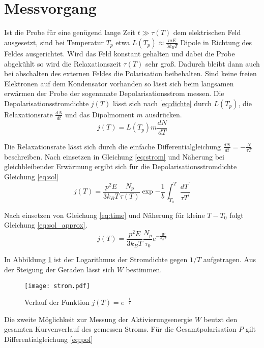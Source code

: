 \section{Messvorgang}
\label{sec:messvorgang}

Ist die Probe für eine genügend lange Zeit $t \gg \tau(T)$ dem elektrischen Feld ausgesetzt,
sind bei Temperatur $T_p$ etwa $L(T_p) \approx \frac{m E}{3 k_B T}$ Dipole in Richtung des Feldes ausgerichtet.
Wird das Feld konstant gehalten und dabei die Probe abgekühlt so wird die Relaxationszeit $\tau(T)$ sehr groß.
Dadurch bleibt dann auch bei abschalten des externen Feldes die Polarisation beibehalten.
Sind keine freien Elektronen auf dem Kondensator vorhanden so lässt sich beim langsamen erwärmen der Probe der sogennnate Depolarisationsstrom messen.
Die Depolarisationsstromdichte $j(T)$ lässt sich nach \eqref{eq:dichte} durch $L(T_p)$, die Relaxationsrate
$\frac{dN}{dt}$ und das Dipolmoment $m$ ausdrücken.
\begin{equation}
  \label{eq:strom}
  j(T) = L(T_p) m \frac{dN}{dT}
\end{equation}


Die Relaxationsrate lässt sich durch die einfache Differentialgleichung $\frac{dN}{dt} = - \frac{N}{\tau{T}}$ beschreiben.
Nach einsetzen in Gleichung \ref{eq:strom} und Näherung bei gleichbleibender Erwärmung ergibt sich für die Depolarisationsstromdichte
Gleichung \eqref{eq:sol}
\begin{equation}
  \label{eq:sol}
  j(T) = \frac{p^2 E}{3 k_B T} \frac{N_p}{\tau(T)} \exp{-\frac{1}{b} \int_{T_0}^{T} \frac{dT^{\prime}}{\tau{T^{\prime}}}}
\end{equation}


Nach einsetzen von Gleichung \ref{eq:time} und Näherung für kleine $T - T_0$ folgt Gleichung \ref{eq:sol_approx}.
\begin{equation}
  \label{eq:sol_approx}
  j(T) = \frac{p^2 E}{3 k_B T} \frac{N_p}{\tau_0} e^{- \frac{W}{k_B T}}
\end{equation}


In Abbildung \ref{fig:lnj} ist der Logarithmus der Stromdichte gegen $1/T$ aufgetragen. Aus der Steigung der Geraden lässt sich $W$ bestimmen.
\begin{figure}
  \label{fig:lnj}
  \texttt{[image: strom.pdf]}
  \caption{Verlauf der Funktion  $j(T) = e^{- \frac{1}{T}}$ }
\end{figure}

Die zweite Möglichkeit zur Messung der Aktivierungsenergie $W$ beutzt den gesamten Kurvenverlauf des gemessen Stroms.
Für die Gesamtpolarisation $P$ gilt Differentialgleichung \eqref{eq:pol}
